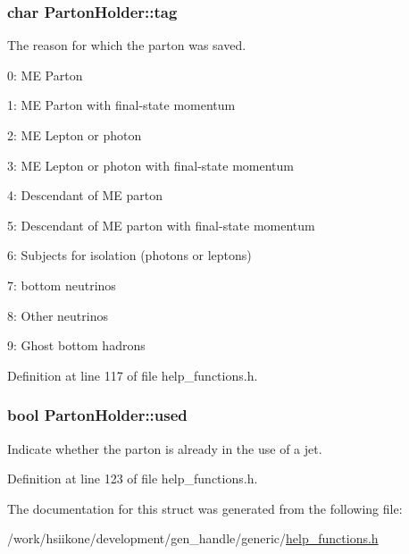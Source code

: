 \subsubsection[{\texorpdfstring{tag}{tag}}]{\setlength{\rightskip}{0pt plus 5cm}char Parton\+Holder\+::tag}\hypertarget{struct_parton_holder_ad824ed477cfc7122a3e494a26c00efbf}{}\label{struct_parton_holder_ad824ed477cfc7122a3e494a26c00efbf}
The reason for which the parton was saved.
\begin{DoxyItemize}
\item 0\+: ME Parton
\item 1\+: ME Parton with final-\/state momentum
\item 2\+: ME Lepton or photon
\item 3\+: ME Lepton or photon with final-\/state momentum
\item 4\+: Descendant of ME parton
\item 5\+: Descendant of ME parton with final-\/state momentum
\item 6\+: Subjects for isolation (photons or leptons)
\item 7\+: bottom neutrinos
\item 8\+: Other neutrinos
\item 9\+: Ghost bottom hadrons 
\end{DoxyItemize}

Definition at line 117 of file help\+\_\+functions.\+h.

\subsubsection[{\texorpdfstring{used}{used}}]{\setlength{\rightskip}{0pt plus 5cm}bool Parton\+Holder\+::used}\hypertarget{struct_parton_holder_a551c1f417a4400ec700b91262b31776f}{}\label{struct_parton_holder_a551c1f417a4400ec700b91262b31776f}
Indicate whether the parton is already in the use of a jet. 

Definition at line 123 of file help\+\_\+functions.\+h.



The documentation for this struct was generated from the following file\+:\begin{DoxyCompactItemize}
\item 
/work/hsiikone/development/gen\+\_\+handle/generic/\hyperlink{help__functions_8h}{help\+\_\+functions.\+h}\end{DoxyCompactItemize}
